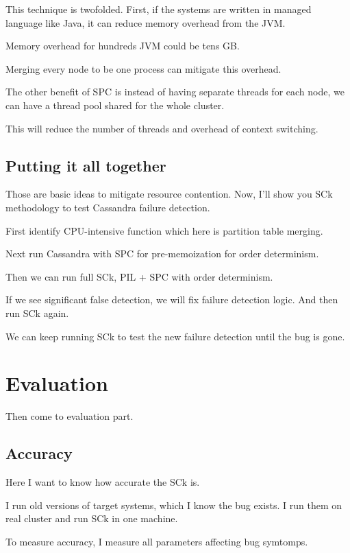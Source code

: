 This technique is twofolded. First, if the systems are written in managed
language like Java, it can reduce memory overhead from the JVM.

Memory overhead for hundreds JVM could be tens GB.

Merging every node to be one process can mitigate this overhead.

The other benefit of SPC is instead of having separate threads for each node, we
can have a thread pool shared for the whole cluster.

This will reduce the number of threads and overhead of context switching.

\subsection{Putting it all together}

Those are basic ideas to mitigate resource contention. Now, I'll show you SCk
methodology to test Cassandra failure detection.

First identify CPU-intensive function which here is partition table merging.

Next run Cassandra with SPC for pre-memoization for order determinism.

Then we can run full SCk, PIL + SPC with order determinism.

If we see significant false detection, we will fix failure detection logic. And
then run SCk again.

We can keep running SCk to test the new failure detection until the bug is
gone.

\section{Evaluation}


Then come to evaluation part.

\subsection{Accuracy}

Here I want to know how accurate the SCk is.

I run old versions of target systems, which I know the bug exists. I run them
on real cluster and run SCk in one machine.

To measure accuracy, I measure all parameters affecting bug symtomps. 


